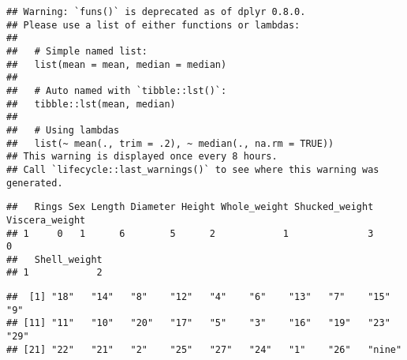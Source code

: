 \documentclass[
]{article}
\newenvironment{Shaded}{\begin{snugshade}}{\end{snugshade}}
\newcommand{\CommentTok}[1]{\textcolor[rgb]{0.56,0.35,0.01}{\textit{#1}}}
\newcommand{\DataTypeTok}[1]{\textcolor[rgb]{0.13,0.29,0.53}{#1}}
\newcommand{\KeywordTok}[1]{\textcolor[rgb]{0.13,0.29,0.53}{\textbf{#1}}}
\newcommand{\NormalTok}[1]{#1}
\newcommand{\OperatorTok}[1]{\textcolor[rgb]{0.81,0.36,0.00}{\textbf{#1}}}
\newcommand{\OtherTok}[1]{\textcolor[rgb]{0.56,0.35,0.01}{#1}}
\newcommand{\StringTok}[1]{\textcolor[rgb]{0.31,0.60,0.02}{#1}}
\begin{document}
\begin{verbatim}
## Warning: `funs()` is deprecated as of dplyr 0.8.0.
## Please use a list of either functions or lambdas: 
## 
##   # Simple named list: 
##   list(mean = mean, median = median)
## 
##   # Auto named with `tibble::lst()`: 
##   tibble::lst(mean, median)
## 
##   # Using lambdas
##   list(~ mean(., trim = .2), ~ median(., na.rm = TRUE))
## This warning is displayed once every 8 hours.
## Call `lifecycle::last_warnings()` to see where this warning was generated.
\end{verbatim}

\begin{verbatim}
##   Rings Sex Length Diameter Height Whole_weight Shucked_weight Viscera_weight
## 1     0   1      6        5      2            1              3              0
##   Shell_weight
## 1            2
\end{verbatim}

\begin{Shaded}
\end{Shaded}

\begin{verbatim}
##  [1] "18"   "14"   "8"    "12"   "4"    "6"    "13"   "7"    "15"   "9"   
## [11] "11"   "10"   "20"   "17"   "5"    "3"    "16"   "19"   "23"   "29"  
## [21] "22"   "21"   "2"    "25"   "27"   "24"   "1"    "26"   "nine"
\end{verbatim}

\begin{Shaded}
\end{Shaded}
\end{document}
